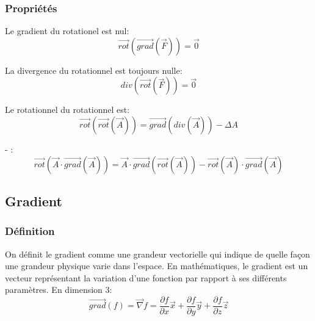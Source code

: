 \documentclass[10pt,a4paper]{article}
\begin{document}
\subsubsection{Propriétés}
Le gradient du rotationel est nul:
\begin{equation}
\overrightarrow{rot}(\overrightarrow{grad}(\overrightarrow{F})) = \overrightarrow{0}
\label{rotgrad}
\end{equation}

La divergence du rotationnel est toujours nulle:
\begin{equation}
div(\overrightarrow{rot}(\overrightarrow{F})) = \overrightarrow{0}
\end{equation}

Le rotationnel du rotationnel est:
\begin{equation}
\overrightarrow{rot}(\overrightarrow{rot}(\overrightarrow{A})) = \overrightarrow{grad}(div(\overrightarrow{A})) - \Delta A
\end{equation}

- :
\begin{equation}
\overrightarrow{rot}(\overrightarrow{A}\cdot\overrightarrow{grad}(\overrightarrow{A})) = \overrightarrow{A}\cdot\overrightarrow{grad}(\overrightarrow{rot}(\overrightarrow{A})) - \overrightarrow{rot}(\overrightarrow{A})\cdot\overrightarrow{grad}(\overrightarrow{A})
\end{equation}


\subsection{Gradient \cite{gradient}}
\subsubsection{Définition}
On définit le gradient comme une grandeur vectorielle qui indique de quelle façon une grandeur physique varie dans l'espace. En mathématiques, le gradient est un vecteur représentant la variation d'une fonction par rapport à ses différents paramètres. En dimension 3:
\begin{equation}
\overrightarrow{grad}(f) = \overrightarrow{\nabla} f = \frac{\partial f}{\partial x}\overrightarrow{x} + \frac{\partial f}{\partial y}\overrightarrow{y} +\frac{\partial f}{\partial z}\overrightarrow{z}
\end{equation}
\end{document}
